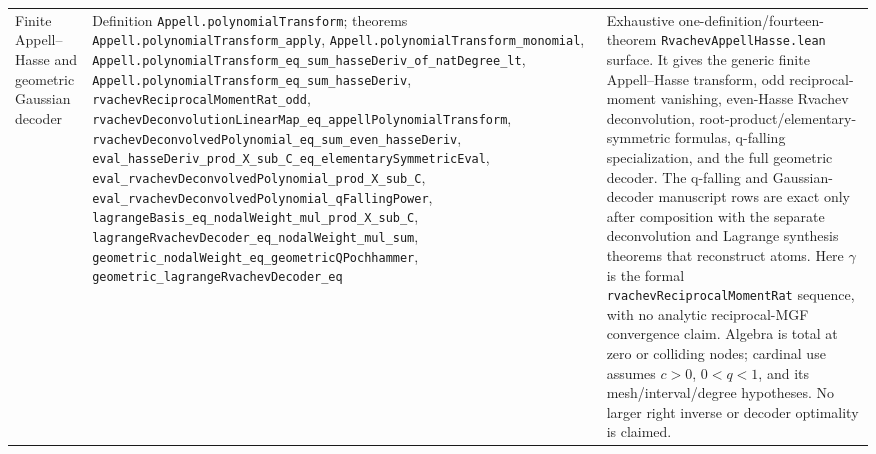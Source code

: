 \documentclass[11pt,oneside]{article}
\theoremstyle{definition}
\theoremstyle{remark}
\begin{document}
\begin{longtable}{@{}>{\raggedright\arraybackslash}p{} >{\raggedright\arraybackslash}p{} >{\raggedright\arraybackslash}p{}@{}}
Finite Appell--Hasse and geometric Gaussian decoder & Definition \nolinkurl{Appell.polynomialTransform}; theorems \nolinkurl{Appell.polynomialTransform_apply}, \nolinkurl{Appell.polynomialTransform_monomial}, \nolinkurl{Appell.polynomialTransform_eq_sum_hasseDeriv_of_natDegree_lt}, \nolinkurl{Appell.polynomialTransform_eq_sum_hasseDeriv}, \nolinkurl{rvachevReciprocalMomentRat_odd}, \nolinkurl{rvachevDeconvolutionLinearMap_eq_appellPolynomialTransform}, \nolinkurl{rvachevDeconvolvedPolynomial_eq_sum_even_hasseDeriv}, \nolinkurl{eval_hasseDeriv_prod_X_sub_C_eq_elementarySymmetricEval}, \nolinkurl{eval_rvachevDeconvolvedPolynomial_prod_X_sub_C}, \nolinkurl{eval_rvachevDeconvolvedPolynomial_qFallingPower}, \nolinkurl{lagrangeBasis_eq_nodalWeight_mul_prod_X_sub_C}, \nolinkurl{lagrangeRvachevDecoder_eq_nodalWeight_mul_sum}, \nolinkurl{geometric_nodalWeight_eq_geometricQPochhammer}, \nolinkurl{geometric_lagrangeRvachevDecoder_eq} & Exhaustive one-definition/fourteen-theorem \nolinkurl{RvachevAppellHasse.lean} surface.  It gives the generic finite Appell--Hasse transform, odd reciprocal-moment vanishing, even-Hasse Rvachev deconvolution, root-product/elementary-symmetric formulas, q-falling specialization, and the full geometric decoder.  The q-falling and Gaussian-decoder manuscript rows are exact only after composition with the separate deconvolution and Lagrange synthesis theorems that reconstruct atoms.  Here \(\gamma\) is the formal \nolinkurl{rvachevReciprocalMomentRat} sequence, with no analytic reciprocal-MGF convergence claim.  Algebra is total at zero or colliding nodes; cardinal use assumes \(c>0\), \(0<q<1\), and its mesh/interval/degree hypotheses.  No larger right inverse or decoder optimality is claimed. \\

\end{longtable}
\end{document}
